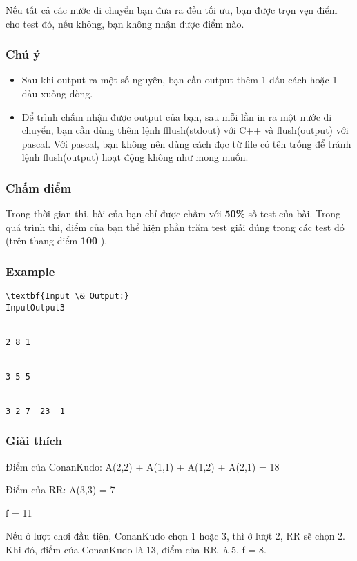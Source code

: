    Nếu tất cả các nước di chuyển bạn đưa ra đều tối ưu, bạn được trọn vẹn điểm cho test đó, nếu không, bạn không nhận được điểm nào.  

\subsubsection{   Chú ý  }
\begin{itemize}
	\item     Sau khi output ra một số nguyên, bạn cần output thêm 1 dấu cách hoặc 1 dấu xuống dòng.   
	\item     Để trình chấm nhận được output của bạn, sau mỗi lần in ra một nước di chuyển, bạn cần dùng thêm lệnh fflush(stdout) với C++ và flush(output) với pascal. Với pascal, bạn không nên dùng cách đọc từ file có tên trống để tránh lệnh flush(output) hoạt động không như mong muốn.   
\end{itemize}

\subsubsection{   Chấm điểm  }

   Trong thời gian thi, bài của bạn chỉ được chấm với   \textbf{    50\%   }   số test của bài. Trong quá trình thi, điểm của bạn thể hiện phần trăm test giải đúng trong các test đó (trên thang điểm   \textbf{    100   }   ).  

\subsubsection{   Example  }
\begin{verbatim}
\textbf{Input \& Output:}
InputOutput3


2 8 1


3 5 5


3 2 7  23  1\end{verbatim}

\subsubsection{   Giải thích  }

   Điểm của ConanKudo: A(2,2) + A(1,1) + A(1,2) + A(2,1) = 18  

   Điểm của RR: A(3,3) = 7  

   f = 11  

   Nếu ở lượt chơi đầu tiên, ConanKudo chọn 1 hoặc 3, thì ở lượt 2, RR sẽ chọn 2. Khi đó, điểm của ConanKudo là 13, điểm của RR là 5, f = 8.  
